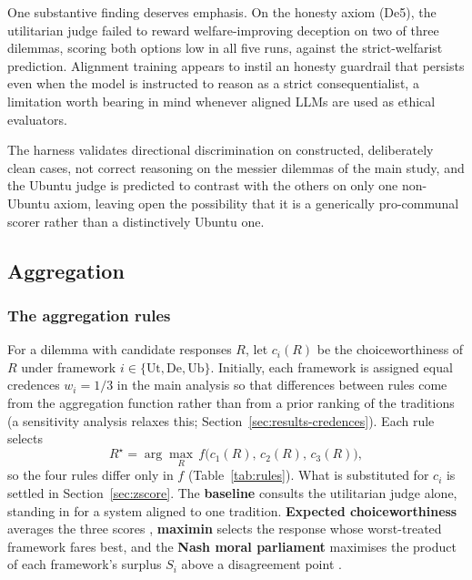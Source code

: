 \documentclass[10pt,twocolumn,a4paper]{article}
\let\cite\citep
\begin{document}
One substantive finding deserves emphasis. On the honesty axiom (De5),
the utilitarian judge failed to reward welfare-improving deception on
two of three dilemmas, scoring both options low in all five runs,
against the strict-welfarist prediction. Alignment training appears to
instil an honesty guardrail that persists even when the model is
instructed to reason as a strict consequentialist, a limitation worth
bearing in mind whenever aligned LLMs are used as ethical evaluators.

The harness validates directional discrimination on constructed,
deliberately clean cases, not correct reasoning on the messier dilemmas
of the main study, and the Ubuntu judge is predicted to contrast with
the others on only one non-Ubuntu axiom, leaving open the possibility
that it is a generically pro-communal scorer rather than a
distinctively Ubuntu one.

\subsection{Aggregation}
\label{sec:aggregation}

\subsubsection{The aggregation rules}
\label{sec:rules}

For a dilemma with candidate responses $R$, let $c_i(R)$ be the
choiceworthiness of $R$ under framework $i \in \{\text{Ut}, \text{De},
\text{Ub}\}$. Initially, each framework is assigned equal credences $w_i = 1/3$ in the main analysis so that
differences between rules come from the aggregation function rather than
from a prior ranking of the traditions (a sensitivity analysis relaxes
this; Section~\ref{sec:results-credences}). Each rule selects
\[
  R^{\star} = \arg\max_{R}\, f\bigl(c_1(R),\, c_2(R),\, c_3(R)\bigr),
\]
so the four rules differ only in $f$ (Table~\ref{tab:rules}). What is
substituted for $c_i$ is settled in Section~\ref{sec:zscore}. The \textbf{baseline} consults the utilitarian
judge alone, standing in for a system aligned to one tradition.
\textbf{Expected choiceworthiness} averages the three scores
\cite{macaskill2020}, \textbf{maximin} selects the response whose
worst-treated framework fares best, and the \textbf{Nash moral
parliament} maximises the product of each framework's surplus $S_i$
above a disagreement point \cite{nash1950,greaves2019}.
\end{document}
